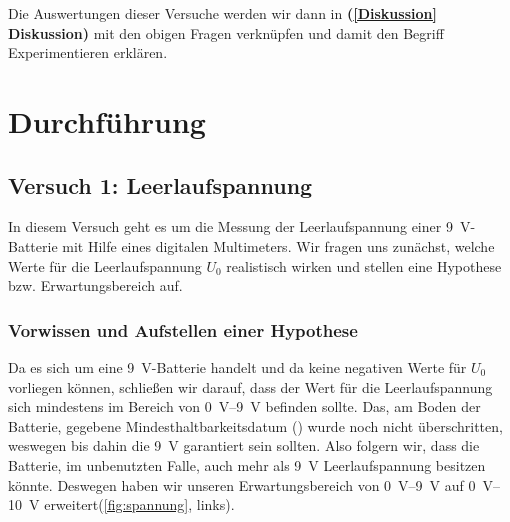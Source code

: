 \documentclass[11pt,a4paper,titlepage, ngerman]{article}
\begin{document}
			Die Auswertungen dieser Versuche werden wir dann in \textbf{(\ref{Diskussion} Diskussion)} mit den obigen Fragen verknüpfen und damit den Begriff \glqq Experimentieren\grqq {} erklären.
	
	\newpage
	\section{Durchführung}
		\label{Durchführung}
		
		\subsection{Versuch 1: Leerlaufspannung}
			\label{2.1}
			
			In diesem Versuch geht es um die Messung der Leerlaufspannung einer \SI{9}{\V}-Batterie mit Hilfe eines digitalen Multimeters. Wir fragen uns zunächst, welche Werte für die Leerlaufspannung $U_0$ realistisch wirken und stellen eine Hypothese bzw. Erwartungsbereich auf.
			
			\subsubsection{Vorwissen und Aufstellen einer Hypothese}
				\label{2.1.1}
				
				Da es sich um eine \SI{9}{\V}-Batterie handelt und da keine negativen Werte für $U_0$ vorliegen können, schließen wir darauf, dass der Wert für die Leerlaufspannung sich mindestens im Bereich von \SIrange{0}{9}{\V} befinden sollte.
				Das, am Boden der Batterie, gegebene Mindesthaltbarkeitsdatum (\grqq) wurde noch nicht überschritten, weswegen bis dahin die \SI{9}{\V} garantiert sein sollten. Also folgern wir, dass die Batterie, im unbenutzten Falle, auch mehr als \SI{9}{\V} Leerlaufspannung besitzen könnte.
				Deswegen haben wir unseren Erwartungsbereich von \SIrange{0}{9}{\V} auf \SIrange{0}{10}{\V} erweitert(\ref{fig:spannung}, links).
				
\end{document}
